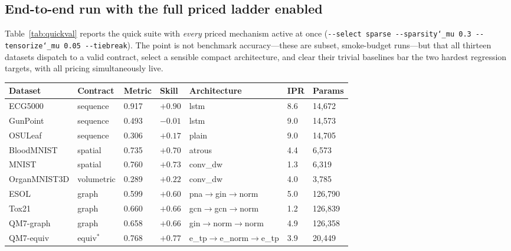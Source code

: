 \documentclass[11pt]{article}
\newcommand{\allowbreakhere}{\discretionary{}{}{}}
\newcommand{\code}[1]{\texttt{\def\_{\char`_\allowbreakhere}#1}}
\begin{document}
\subsection{End-to-end run with the full priced ladder enabled}
\label{sec:fullrun}

Table~\ref{tab:quickval} reports the quick suite with \emph{every} priced mechanism active at once
(\code{-{}-select sparse -{}-sparsity\_mu 0.3 -{}-tensorize\_mu 0.05 -{}-tiebreak}). The point is not
benchmark accuracy---these are subset, smoke-budget runs---but that all thirteen datasets dispatch to a
valid contract, select a sensible compact architecture, and clear their trivial baselines bar the two
hardest regression targets, with all pricing simultaneously live.

\begin{table}[h]
\centering
\small
\renewcommand{\arraystretch}{1.15}
\begin{tabular}{p{2.6cm} p{1.7cm} p{1.1cm} p{0.9cm} p{2.6cm} p{0.7cm} p{1.1cm}}
\toprule
\textbf{Dataset} & \textbf{Contract} & \textbf{Metric} & \textbf{Skill} & \textbf{Architecture} & \textbf{IPR} & \textbf{Params}\\
\midrule
ECG5000       & sequence   & 0.917 & $+0.90$ & lstm                         & 8.6 & 14{,}672\\
GunPoint      & sequence   & 0.493 & $-0.01$ & lstm                         & 9.0 & 14{,}573\\
OSULeaf       & sequence   & 0.306 & $+0.17$ & plain                        & 9.0 & 14{,}705\\
BloodMNIST    & spatial    & 0.735 & $+0.70$ & atrous                       & 4.4 & 6{,}573\\
MNIST         & spatial    & 0.760 & $+0.73$ & conv\_dw                     & 1.3 & 6{,}319\\
OrganMNIST3D  & volumetric & 0.289 & $+0.22$ & conv\_dw                     & 4.0 & 3{,}785\\
ESOL          & graph      & 0.599 & $+0.60$ & pna$\to$\allowbreak gin$\to$\allowbreak norm         & 5.0 & 126{,}790\\
Tox21         & graph      & 0.660 & $+0.66$ & gcn$\to$\allowbreak gcn$\to$\allowbreak norm         & 1.2 & 126{,}839\\
QM7-graph     & graph      & 0.658 & $+0.66$ & gin$\to$\allowbreak norm$\to$\allowbreak norm        & 4.9 & 126{,}358\\
QM7-equiv     & equiv$^\ast$ & 0.768 & $+0.77$ & e\_tp$\to$\allowbreak e\_norm$\to$\allowbreak e\_tp   & 3.9 & 20{,}449\\

\end{tabular}
\end{table}
\end{document}
